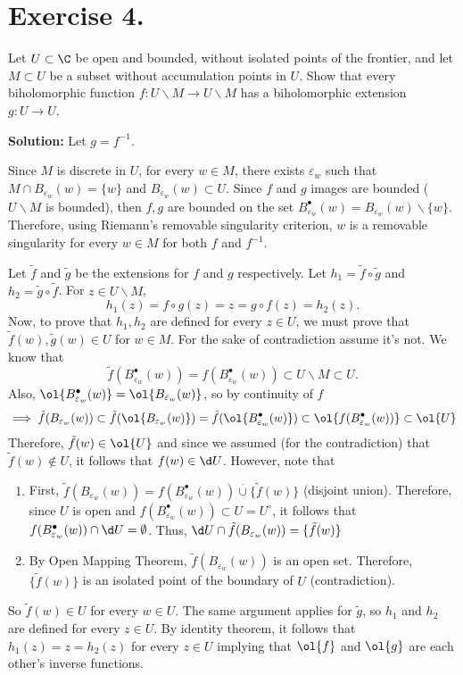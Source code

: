 \section*{Exercise 4.}

Let $U \subset \C$ be open and bounded, without isolated points of the frontier, and let $M \subset U$ be a subset without accumulation points in $U$. Show that every biholomorphic function $f: U \backslash M \to U \backslash M$ has a biholomorphic extension $g: U \to U$.

\textbf{Solution:}
Let $g = f^{-1}$.

Since $M$ is discrete in $U$, for every $w \in M$, there exists $\varepsilon_w$ such that $M \cap B_{\varepsilon_w}(w) = \{w\}$ and $B_{\varepsilon_w}(w) \subset U$. Since $f$ and $g$ images are bounded ($U\backslash M$ is bounded), then $f,g$ are bounded on the set $B_{\varepsilon_w}^\bullet(w) = B_{\varepsilon_w}(w) \backslash \{w\}$. Therefore, using Riemann's removable singularity criterion, $w$ is a removable singularity for every $w \in M$ for both $f$ and $f^{-1}$.

Let $\tilde{f}$ and $\tilde{g}$ be the extensions for $f$ and $g$ respectively. Let $h_1 = \tilde{f} \circ \tilde{g}$ and $h_2 = \tilde{g}\circ \tilde{f}$. For $z \in U\backslash M$, 
\[ h_1(z) = f\circ g (z) = z = g\circ f(z) = h_2(z). \]
Now, to prove that $h_1, h_2$ are defined for every $z\in U$, we must prove that $\tilde{f}(w), \tilde{g}(w) \in U$ for $w \in M$. For the sake of contradiction assume it's not. We know that
\[ \tilde{f}(B_{\varepsilon_w}^\bullet(w)) = f(B_{\varepsilon_w}^\bullet(w)) \subset U\backslash M \subset U.\]
Also, $\ol{B_{\varepsilon_w}^\bullet(w)} = \ol{B_{\varepsilon_w}(w)}$, so by continuity of $f$
\[ \implies \tilde{f}(B_{\varepsilon_w}(w)) \subset \tilde{f}(\ol{B_{\varepsilon_w}(w)}) = \tilde{f}(\ol{B_{\varepsilon_w}^\bullet(w)}) \subset \ol{f(B_{\varepsilon_w}^\bullet(w))} \subset \ol{U} \]
Therefore, $\tilde{f}(w) \in \ol{U}$ and since we assumed (for the contradiction) that $\tilde{f}(w) \not\in U$, it follows that $f(w) \in \d U$. However, note that
\begin{enumerate}
    \item First, $\tilde{f}(B_{\varepsilon_w}(w)) = f(B_{\varepsilon_w}^\bullet (w)) \overset{\cdot}{\cup} \{\tilde{f}(w)\}$ (disjoint union). Therefore, since $U$ is open and $ f(B_{\varepsilon_w}^\bullet (w)) \subset U = U^\circ$, it follows that $f(B_{\varepsilon_w}^\bullet (w)) \cap  \d U = \emptyset$. Thus, $ \d U \cap \tilde{f}(B_{\varepsilon_w}(w)) = \{\tilde{f}(w)\}$
    \item By Open Mapping Theorem, $\tilde{f}(B_{\varepsilon_w}(w))$ is an open set. Therefore, $\{\tilde{f}(w)\}$ is an isolated point of the boundary of $U$ (contradiction).
\end{enumerate}
So $\tilde{f}(w) \in U$ for every $w\in U$. The same argument applies for $\tilde{g}$, so $h_1$ and $h_2$ are defined for every $z\in U$. By identity theorem, it follows that $h_1(z) = z = h_2(z)$ for every $z\in U$ implying that $\ol{f}$ and $\ol{g}$ are each other's inverse functions.